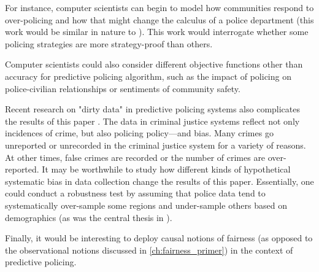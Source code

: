 For instance, computer scientists can begin to model how communities respond to over-policing and how that might change the calculus of a police department (this work would be similar in nature to \citet{liu_delayed_2018}). This work would interrogate whether some policing strategies are more strategy-proof than others.

Computer scientists could also consider different objective functions other than accuracy for predictive policing algorithm, such as the impact of policing on police-civilian relationships or sentiments of community safety.

Recent research on "dirty data" in predictive policing systems also complicates the results of this paper \citep{richardson_dirty_2019}. The data in criminal justice systems reflect not only incidences of crime, but also policing policy---and bias. Many crimes go unreported or unrecorded in the criminal justice system for a variety of reasons. At other times, false crimes are recorded or the number of crimes are over-reported. It may be worthwhile to study how different kinds of hypothetical systematic bias in data collection change the results of this paper. Essentially, one could conduct a robustness test by assuming that police data tend to systematically over-sample some regions and under-sample others based on demographics (as was the central thesis in \citet{lum_predict_2016}).

Finally, it would be interesting to deploy causal notions of fairness (as opposed to the observational notions discussed in \autoref{ch:fairness_primer}) in the context of predictive policing.